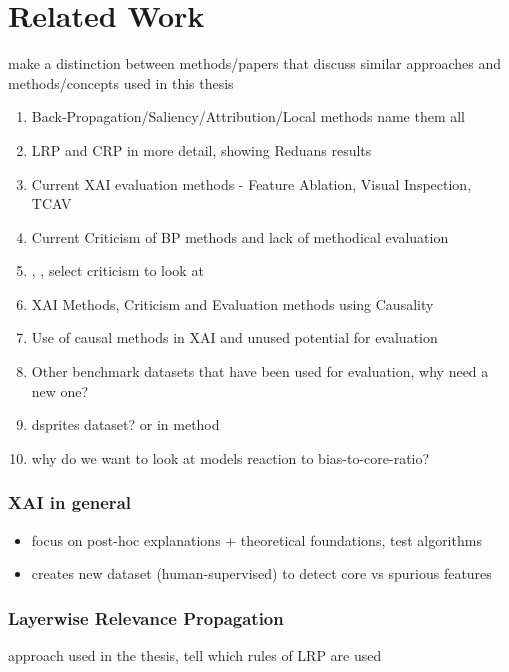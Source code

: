 
\chapter{Related Work}\label{chapter:related_work}


{\color{red} make a distinction between methods/papers that discuss similar approaches and methods/concepts used in this thesis}

\begin{enumerate}
      \item Back-Propagation/Saliency/Attribution/Local methods name them all
      \item LRP and CRP in more detail, showing Reduans results
      \item Current XAI evaluation methods - Feature Ablation, Visual Inspection, TCAV
      \item Current Criticism of BP methods and lack of methodical evaluation
      \item \cite{Sixt2020}, \cite{Wilming2023}, \cite{Kindermans2019} select criticism to look at
      \item XAI Methods, Criticism and Evaluation methods using Causality
      \item Use of causal methods in XAI and unused potential for evaluation
      \item Other benchmark datasets that have been used for evaluation, why need a new one?
      \item dsprites dataset? or in method
      \item why do we want to look at models reaction to bias-to-core-ratio?
\end{enumerate}


\subsection{XAI in general}

\begin{itemize}
      \item focus on post-hoc explanations + theoretical foundations, test algorithms \cite{Samek2021}
      \item creates new dataset (human-supervised) to detect core vs spurious features \cite{Singla2022}
\end{itemize}

\subsection{Layerwise Relevance Propagation}
{\color{red} approach used in the thesis, tell which rules of LRP are used}

